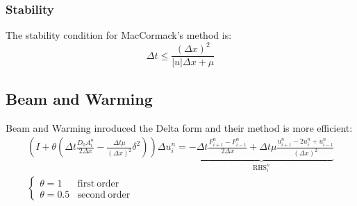 \documentclass[11pt, a4paper]{article}
\begin{document}
\subsubsection{Stability}
The stability condition for MacCormack's method is:
\begin{equation}
    \Delta t\le\frac{\left(\Delta x\right)^2}{\left|u\right|\Delta x+\mu}
\end{equation}

\subsection{Beam and Warming}
Beam and Warming inroduced the Delta form and their method is more efficient:
\begin{equation}
    \begin{array}{c}
        \displaystyle\left(I+\theta\left(\Delta t\frac{D_0A_i^n}{2\Delta x}-\frac{\Delta t\mu}{\left(\Delta x\right)^2}\delta^2\right)\right)\Delta u_i^n=\underbrace{-\Delta t\frac{F_{i+1}^n-F_{i-1}^n}{2\Delta x}+\Delta t\mu\frac{u^n_{i+1}-2u^n_i+u^n_{i-1}}{\left(\Delta x\right)^2}}_{\displaystyle\mathrm{RHS}_i^n} \\
        \left\{\begin{array}{ll}
            \theta=1 & \mathrm{first\ order} \\
            \theta=0.5 & \mathrm{second\ order}
        \end{array}\right.
    \end{array}
\end{equation}

\end{document}
